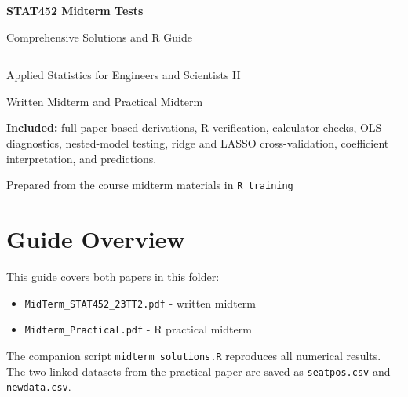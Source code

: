 ﻿\documentclass[11pt]{article}
\begin{document}
\hypersetup{pageanchor=false}

\begin{titlepage}
  \centering
  \vspace*{1.1in}
  {\sffamily\color{navy}\Huge\bfseries STAT452 Midterm Tests\par}
  \vspace{0.28in}
  {\sffamily\color{teal}\LARGE Comprehensive Solutions and R Guide\par}
  \vspace{0.55in}
  {\color{navy!45}\rule{0.78\textwidth}{1.1pt}\par}
  \vspace{0.55in}
  {\Large Applied Statistics for Engineers and Scientists II\par}
  \vspace{0.2in}
  {\large Written Midterm and Practical Midterm\par}
  \vfill
  \begin{minipage}{0.78\textwidth}
    \colorbox{navy!7}{\parbox{0.94\linewidth}{
      \textbf{Included:} full paper-based derivations, R verification,
      calculator checks, OLS diagnostics, nested-model testing, ridge and
      LASSO cross-validation, coefficient interpretation, and predictions.
    }}
  \end{minipage}
  \vfill
  {\sffamily\small Prepared from the course midterm materials in \texttt{R\_training}\par}
\end{titlepage}
\hypersetup{pageanchor=true}

\tableofcontents
\clearpage
{}

\section*{Guide Overview}

This guide covers both papers in this folder:

\begin{itemize}
\item \texttt{MidTerm\_STAT452\_23TT2.pdf} - written midterm
\item \texttt{Midterm\_Practical.pdf} - R practical midterm
\end{itemize}

The companion script \texttt{midterm\_solutions.R} reproduces all numerical results. The
two linked datasets from the practical paper are saved as \texttt{seatpos.csv} and
\texttt{newdata.csv}.
\end{document}
